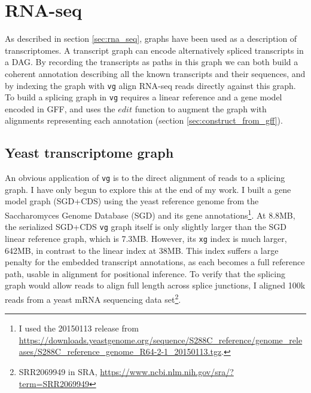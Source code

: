 \section{RNA-seq}

As described in section \ref{sec:rna_seq}, graphs have been used as a description of transcriptomes.
A transcript graph can encode alternatively spliced transcripts in a DAG.
By recording the transcripts as paths in this graph we can both build a coherent annotation describing all the known transcripts and their sequences, and by indexing the graph with {\tt vg} align RNA-seq reads directly against this graph.
To build a splicing graph in {\tt vg} requires a linear reference and a gene model encoded in GFF, and uses the $edit$ function to augment the graph with alignments representing each annotation (section \ref{sec:construct_from_gff}).

\subsection{Yeast transcriptome graph}

An obvious application of {\tt vg} is to the direct alignment of reads to a splicing graph.
I have only begun to explore this at the end of my work.
I built a gene model graph (SGD+CDS) using the yeast reference genome from the Saccharomyces Genome Database (SGD) and its gene annotations\footnote{I used the 20150113 release from \url{https://downloads.yeastgenome.org/sequence/S288C_reference/genome_releases/S288C_reference_genome_R64-2-1_20150113.tgz}.}.
At 8.8MB, the serialized SGD+CDS {\tt vg} graph itself is only slightly larger than the SGD linear reference graph, which is 7.3MB.
However, its {\tt xg} index is much larger, 642MB, in contrast to the linear index at 38MB.
This index suffers a large penalty for the embedded transcript annotations, as each becomes a full reference path, usable in alignment for positional inference.
To verify that the splicing graph would allow reads to align full length across splice junctions, I aligned 100k reads from a yeast mRNA sequencing data set\footnote{SRR2069949 in SRA, \url{https://www.ncbi.nlm.nih.gov/sra/?term=SRR2069949}}.

